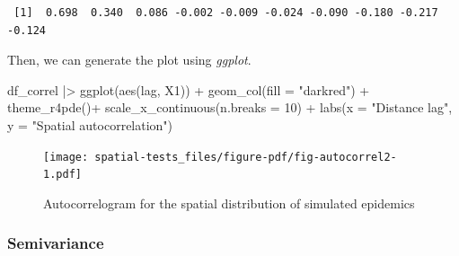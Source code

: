 \documentclass[
  letterpaper,
]{book}
\newenvironment{Shaded}{\begin{snugshade}}{\end{snugshade}}
\newcommand{\AttributeTok}[1]{\textcolor[rgb]{0.40,0.45,0.13}{#1}}
\newcommand{\CommentTok}[1]{\textcolor[rgb]{0.37,0.37,0.37}{#1}}
\newcommand{\DecValTok}[1]{\textcolor[rgb]{0.68,0.00,0.00}{#1}}
\newcommand{\FunctionTok}[1]{\textcolor[rgb]{0.28,0.35,0.67}{#1}}
\newcommand{\NormalTok}[1]{\textcolor[rgb]{0.00,0.23,0.31}{#1}}
\newcommand{\OtherTok}[1]{\textcolor[rgb]{0.00,0.23,0.31}{#1}}
\newcommand{\SpecialCharTok}[1]{\textcolor[rgb]{0.37,0.37,0.37}{#1}}
\newcommand{\StringTok}[1]{\textcolor[rgb]{0.13,0.47,0.30}{#1}}
\begin{document}
\begin{Shaded}
\end{Shaded}

\begin{verbatim}
 [1]  0.698  0.340  0.086 -0.002 -0.009 -0.024 -0.090 -0.180 -0.217 -0.124
\end{verbatim}

Then, we can generate the plot using \emph{ggplot}.

\begin{Shaded}
\begin{Highlighting}[]
\NormalTok{df\_correl }\SpecialCharTok{|\textgreater{}}
  \FunctionTok{ggplot}\NormalTok{(}\FunctionTok{aes}\NormalTok{(lag, X1)) }\SpecialCharTok{+}
  \FunctionTok{geom\_col}\NormalTok{(}\AttributeTok{fill =} \StringTok{"darkred"}\NormalTok{) }\SpecialCharTok{+}
  \FunctionTok{theme\_r4pde}\NormalTok{()}\SpecialCharTok{+}
  \FunctionTok{scale\_x\_continuous}\NormalTok{(}\AttributeTok{n.breaks =} \DecValTok{10}\NormalTok{) }\SpecialCharTok{+}
  \FunctionTok{labs}\NormalTok{(}\AttributeTok{x =} \StringTok{"Distance lag"}\NormalTok{, }\AttributeTok{y =} \StringTok{"Spatial autocorrelation"}\NormalTok{)}
\end{Highlighting}
\end{Shaded}

\begin{figure}[H]

{\centering \texttt{[image: spatial-tests\_files/figure-pdf/fig-autocorrel2-1.pdf]}

}

\caption{\label{fig-autocorrel2}Autocorrelogram for the spatial
distribution of simulated epidemics}

\end{figure}

\hypertarget{semivariance}{%
\subsubsection{Semivariance}\label{semivariance}}
\end{document}
